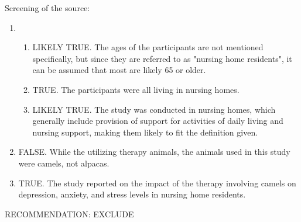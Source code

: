 \documentclass{article}
\begin{document}
\begin{description}
  Screening of the source:

  \begin{enumerate}[label=\arabic*.\ ]
    \item 
    \begin{enumerate}[label=\arabic{enumi}\alph*.\ ]
      \item LIKELY TRUE. The ages of the participants are not mentioned
        specifically, but since they are referred to as "nursing home
        residents", it can be assumed that most are likely 65 or older.
      \item TRUE. The participants were all living in nursing homes.
      \item LIKELY TRUE. The study was conducted in nursing homes, which
        generally include provision of support for activities of daily living
        and nursing support, making them likely to fit the definition given.
    \end{enumerate}
  \item FALSE. While the utilizing therapy animals, the animals used in this
    study were camels, not alpacas.
  \item TRUE. The study reported on the impact of the therapy involving camels
    on depression, anxiety, and stress levels in nursing home residents.
  \end{enumerate}

  RECOMMENDATION:
  EXCLUDE

\end{description}
\end{document}
